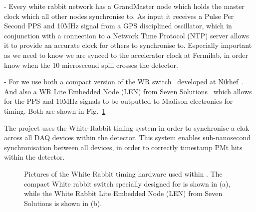 - Every white rabbit network has a GrandMaster node which holds the master clock which all other
nodes synchronise to. As input it receives a Pulse Per Second PPS and 10MHz signal from a GPS
disciplined oscillator, which in conjunction with a connection to a Network Time Protocol (NTP)
server allows it to provide an accurate clock for others to synchronise to. Especially important
as we need to know we are synced to the accelerator clock at Fermilab, in order know when the 10
microsecond spill crosses the detector.

- For \chipsfive we use both a compact version of the WR switch~\cite{wrswitch2020} developed at
Nikhef~\cite{wrchromium2020}. And also a WR Lite Embedded Node (LEN) from Seven
Solutions~\cite{wrswitch2020} which allows for the PPS and 10MHz signals to be outputted to
Madison electronics for timing. Both are shown in Fig.~\ref{fig:wr_electronics}

The \chips project uses the White-Rabbit timing system in order to synchronise a clok across all
DAQ devices within the detector. This system enables sub-nanosecond synchronisation between all
devices, in order to correctly timestamp PMt hits within the detector.

\begin{figure} %
    \centering
    \quad
    \caption[Pictures of the White Rabbit timing hardware used within \chipsfive.]
    {Pictures of the White Rabbit timing hardware used within \chipsfive. The compact White rabbit
        switch specially designed for \chips is shown in (a), while the White Rabbit Lite Embedded
        Node (LEN) from Seven Solutions is shown in (b).}
    \label{fig:wr_electronics}
\end{figure}

